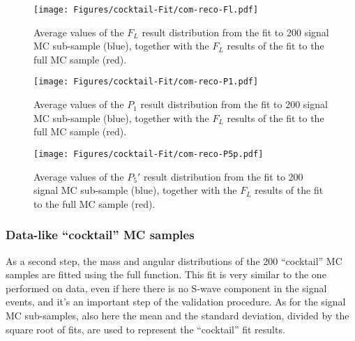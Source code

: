 \begin{figure}[!hbt]
  \centering
  \texttt{[image: Figures/cocktail-Fit/com-reco-Fl.pdf]}
  \caption{Average values of the $F_L$ result distribution from the fit to 200 signal MC sub-sample (blue), together with the $F_L$ results of the fit to the full MC sample (red).}
  \label{fig:sub-samp-FL}
\end{figure}


\begin{figure}[!hbt]
  \centering
  \texttt{[image: Figures/cocktail-Fit/com-reco-P1.pdf]}
  \caption{Average values of the $P_1$ result distribution from the fit to 200 signal MC sub-sample (blue), together with the $F_L$ results of the fit to the full MC sample (red).}
  \label{fig:sub-samp-P1}
\end{figure}

\begin{figure}[!hbt]
  \centering
  \texttt{[image: Figures/cocktail-Fit/com-reco-P5p.pdf]}
  \caption{Average values of the $P_5'$ result distribution from the fit to 200 signal MC sub-sample (blue), together with the $F_L$ results of the fit to the full MC sample (red).}
  \label{fig:sub-samp-P5p}
\end{figure}

\clearpage




\subsubsection{Data-like ``cocktail'' MC samples}
\label{sec:Cocktail-MC-full}

As a second step, the mass and angular distributions of the 200 ``cocktail'' MC samples are fitted using the full \pdf function.
This fit is very similar to the one performed on data, even if here there is no S-wave component in the signal events, and it's an important step of the validation procedure.
As for the signal MC sub-samples, also here the mean and the standard deviation, divided by the square root of fits, are used to represent the ``cocktail'' fit results.

